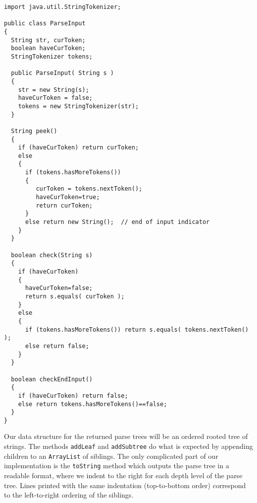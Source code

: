 \label{parsecode}
{\footnotesize%
\renewcommand{\ttdefault}{pcr} %
\begin{verbatim}
import java.util.StringTokenizer;

public class ParseInput 
{ 
  String str, curToken;
  boolean haveCurToken;
  StringTokenizer tokens;

  public ParseInput( String s ) 
  { 
    str = new String(s);  
    haveCurToken = false;
    tokens = new StringTokenizer(str);
  }

  String peek()
  {
    if (haveCurToken) return curToken;
    else
    {
      if (tokens.hasMoreTokens())
      { 
         curToken = tokens.nextToken();  
         haveCurToken=true;
         return curToken;
      }
      else return new String();  // end of input indicator
    }
  }

  boolean check(String s)
  {
    if (haveCurToken) 
    { 
      haveCurToken=false; 
      return s.equals( curToken ); 
    }
    else 
    { 
      if (tokens.hasMoreTokens()) return s.equals( tokens.nextToken() ); 
      else return false;
    }
  }

  boolean checkEndInput()
  {
    if (haveCurToken) return false;
    else return tokens.hasMoreTokens()==false; 
  }
}
\end{verbatim}%
}%

Our data structure for the returned parse trees will be an ordered
rooted tree of strings.  The methods \verb|addLeaf| and 
\verb|addSubtree| do what is expected by appending children 
to an \verb|ArrayList| of siblings.
The only complicated part of our implementation is the \verb|toString| 
method which outputs the parse tree in a readable format, where we
indent to the right for each depth level of the parse tree.
Lines printed with the same indentation (top-to-bottom order) correspond
to the left-to-right ordering of the siblings.

